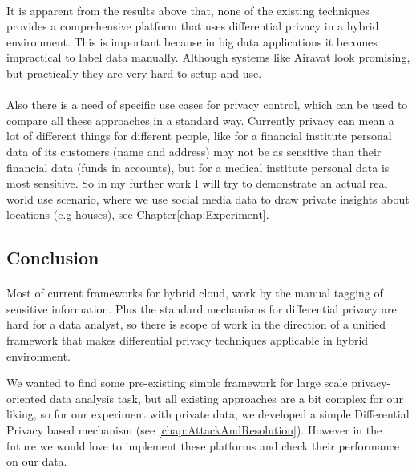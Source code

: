 \documentclass[12pt]{report}
\theoremstyle{named}
\begin{document}
\paragraph{}
It is apparent from the results above that, none of the existing techniques provides a comprehensive platform that uses differential privacy in a hybrid environment. This is important because in big data applications it becomes impractical to label data manually. Although systems like Airavat \cite{roy2010airavat} look promising, but practically they are very hard to setup and use.

\paragraph{}
Also there is a need of specific use cases for privacy control, which can be used to compare all these approaches in a standard way. Currently privacy can mean a lot of different things for different people, like for a financial institute personal data of its customers (name and address) may not be as sensitive than their financial data (funds in accounts), but for a medical institute personal data is most sensitive. So in my further work I will try to demonstrate an actual real world use scenario, where we use social media data to draw private insights about locations (e.g houses), see Chapter\ref{chap:Experiment}.



\subsection{Conclusion}
\paragraph{}
Most of current frameworks for hybrid cloud, work by the manual tagging of sensitive information. Plus the standard mechanisms for differential privacy are hard for a data analyst, so there is scope of work in the direction of a unified framework that makes differential privacy techniques applicable in hybrid environment. 

We wanted to find some pre-existing simple framework for large scale privacy-oriented data analysis task, but all existing approaches are a bit complex for our liking, so for our experiment with private data, we developed a simple Differential Privacy based mechanism (see \ref{chap:AttackAndResolution}). However in the future we would love to implement these platforms and check their performance on our data.
\end{document}
